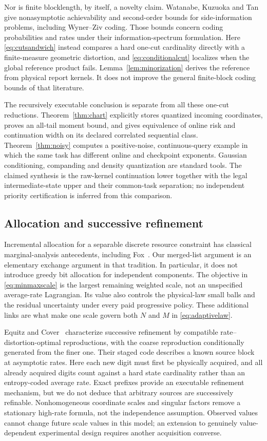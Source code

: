 Nor is finite blocklength, by itself, a novelty claim. Watanabe, Kuzuoka and Tan~\cite{watanabe} give nonasymptotic achievability and second-order bounds for side-information problems, including Wyner--Ziv coding. Those bounds concern coding probabilities and rates under their information-spectrum formulation. Here \eqref{eq:cutsandwich} instead compares a hard one-cut cardinality directly with a finite-measure geometric distortion, and \eqref{eq:conditionalcut} localizes when the global reference product fails. Lemma~\ref{lem:minorization} derives the reference from physical report kernels. It does not improve the general finite-block coding bounds of that literature.

The recursively executable conclusion is separate from all these one-cut reductions. Theorem~\ref{thm:chart} explicitly stores quantized incoming coordinates, proves an all-tail moment bound, and gives equivalence of online risk and continuation width on its declared correlated sequential class. Theorem~\ref{thm:noisy} computes a positive-noise, continuous-query example in which the same task has different online and checkpoint exponents. Gaussian conditioning, companding and density quantization are standard tools. The claimed synthesis is the raw-kernel continuation lower together with the legal intermediate-state upper and their common-task separation; no independent priority certification is inferred from this comparison.

\subsection{Allocation and successive refinement}
Incremental allocation for a separable discrete resource constraint has classical marginal-analysis antecedents, including Fox~\cite{fox}. Our merged-list argument is an elementary exchange argument in that tradition. In particular, it does not introduce greedy bit allocation for independent components. The objective in \eqref{eq:minmaxscale} is the largest remaining weighted scale, not an unspecified average-rate Lagrangian. Its value also controls the physical-law small balls and the residual uncertainty under every paid progressive policy. These additional links are what make one scale govern both $N$ and $M$ in \eqref{eq:adaptivelaw}.

Equitz and Cover~\cite{equitz} characterize successive refinement by compatible rate--distortion-optimal reproductions, with the coarse reproduction conditionally generated from the finer one. Their staged code describes a known source block at asymptotic rates. Here each new digit must first be physically acquired, and all already acquired digits count against a hard state cardinality rather than an entropy-coded average rate. Exact prefixes provide an executable refinement mechanism, but we do not deduce that arbitrary sources are successively refinable. Nonhomogeneous coordinate scales and singular factors remove a stationary high-rate formula, not the independence assumption. Observed values cannot change future scale values in this model; an extension to genuinely value-dependent experimental design requires another acquisition converse.

